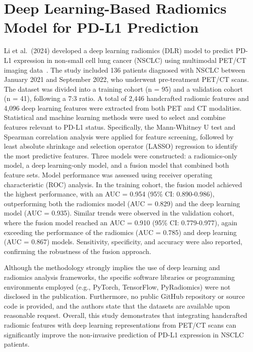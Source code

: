 \section{Deep Learning-Based Radiomics Model for PD-L1 Prediction}

Li et al.\ (2024) developed a deep learning radiomics (DLR) model to predict PD-L1 expression in non-small cell lung cancer (NSCLC) using multimodal PET/CT imaging data~\cite{Li2024-np}. The study included 136 patients diagnosed with NSCLC between January 2021 and September 2022, who underwent pre-treatment PET/CT scans. The dataset was divided into a training cohort (n = 95) and a validation cohort (n = 41), following a 7:3 ratio. A total of 2,446 handcrafted radiomic features and 4,096 deep learning features were extracted from both PET and CT modalities. Statistical and machine learning methods were used to select and combine features relevant to PD-L1 status. Specifically, the Mann-Whitney U test and Spearman correlation analysis were applied for feature screening, followed by least absolute shrinkage and selection operator (LASSO) regression to identify the most predictive features. Three models were constructed: a radiomics-only model, a deep learning-only model, and a fusion model that combined both feature sets.
Model performance was assessed using receiver operating characteristic (ROC) analysis. In the training cohort, the fusion model achieved the highest performance, with an AUC = 0.954 (95\% CI: 0.890-0.986), outperforming both the radiomics model (AUC = 0.829) and the deep learning model (AUC = 0.935). Similar trends were observed in the validation cohort, where the fusion model reached an AUC = 0.910 (95\% CI: 0.779-0.977), again exceeding the performance of the radiomics (AUC = 0.785) and deep learning (AUC = 0.867) models. Sensitivity, specificity, and accuracy were also reported, confirming the robustness of the fusion approach. 

Although the methodology strongly implies the use of deep learning and radiomics analysis frameworks, the specific software libraries or programming environments employed (e.g., PyTorch, TensorFlow, PyRadiomics) were not disclosed in the publication. Furthermore, no public GitHub repository or source code is provided, and the authors state that the datasets are available upon reasonable request. Overall, this study demonstrates that integrating handcrafted radiomic features with deep learning representations from PET/CT scans can significantly improve the non-invasive prediction of PD-L1 expression in NSCLC patients.